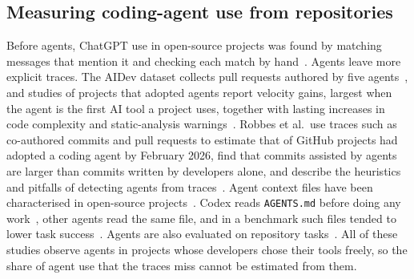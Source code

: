 \documentclass{article}
\begin{document}
\subsection{Measuring coding-agent use from repositories}
Before agents, ChatGPT use in open-source projects was found by matching messages that mention it and checking each match by hand~\cite{tufano2024chatgpt}. Agents leave more explicit traces. The AIDev dataset collects pull requests authored by five agents~\cite{li2025aidev}, and studies of projects that adopted agents report velocity gains, largest when the agent is the first AI tool a project uses, together with lasting increases in code complexity and static-analysis warnings~\cite{agarwal2026aiides,he2026cursor}. Robbes et al.\ use traces such as co-authored commits and pull requests to estimate that \robbesrate{} of \robbesprojects{} GitHub projects had adopted a coding agent by February 2026, find that commits assisted by agents are larger than commits written by developers alone, and describe the heuristics and pitfalls of detecting agents from traces~\cite{robbes2026agenticmuch,robbes2026heuristics}. Agent context files have been characterised in open-source projects~\cite{chatlatanagulchai2025agentreadmes}. Codex reads \texttt{AGENTS.md} before doing any work~\cite{openai2026agentsmd}, other agents read the same file, and in a benchmark such files tended to lower task success~\cite{gloaguen2026agentsmd}. Agents are also evaluated on repository tasks~\cite{jimenez2023swebench,yang2024sweagent}. All of these studies observe agents in projects whose developers chose their tools freely, so the share of agent use that the traces miss cannot be estimated from them.
\end{document}
